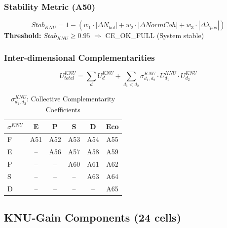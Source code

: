 \subsubsection{Stability Metric (A50)}

\begin{tcolorbox}[colback=green!5!white, colframe=green!50!black]
\begin{equation}
\boxed{
Stab_{KNU} = 1 - (w_1 \cdot |\Delta N_{kol}| + w_2 \cdot |\Delta NormCoh| + w_3 \cdot |\Delta \lambda_{pos}|)
}
\end{equation}
\textbf{Threshold:} $Stab_{KNU} \ge 0.95$ $\Rightarrow$ CE\_OK\_FULL (System stable)
\end{tcolorbox}

\subsubsection{Inter-dimensional Complementarities}

\begin{equation}
U^{KNU}_{total} = \sum_d U^{KNU}_d + \sum_{d_1 < d_2} \sigma^{KNU}_{d_1,d_2} \cdot U^{KNU}_{d_1} \cdot U^{KNU}_{d_2}
\end{equation}

\begin{table}[htbp]
\centering
\caption{$\sigma^{KNU}_{d_1,d_2}$: Collective Complementarity Coefficients}
\label{tab:knu-sigma-matrix}
\small
\renewcommand{\arraystretch}{1.3}
\begin{tabular}{@{}lccccc@{}}
\toprule
$\sigma^{KNU}$ & E & P & S & D & Eco \\
\midrule
F & A51 & A52 & A53 & A54 & A55 \\
E & -- & A56 & A57 & A58 & A59 \\
P & -- & -- & A60 & A61 & A62 \\
S & -- & -- & -- & A63 & A64 \\
D & -- & -- & -- & -- & A65 \\
\bottomrule
\end{tabular}
\end{table}

\subsection{KNU-Gain Components (24 cells)}

